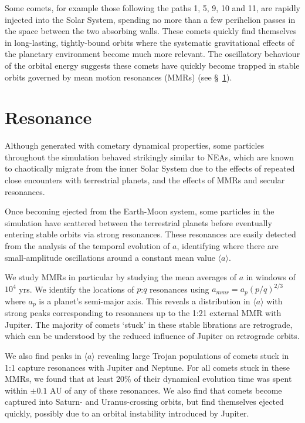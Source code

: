 Some comets, for example those following the paths 1, 5, 9, 10 and 11, are rapidly injected into the Solar System, spending no more than a few perihelion passes in the space between the two absorbing walls. These comets quickly find themselves in long-lasting, tightly-bound orbits where the systematic gravitational effects of the planetary environment become much more relevant. The oscillatory behaviour of the orbital energy suggests these comets have quickly become trapped in stable orbits governed by mean motion resonances (MMRs) (see \S~\ref{sec:resonance}).


\section{Resonance}
\label{sec:resonance}

Although generated with cometary dynamical properties, some particles throughout the simulation behaved strikingly similar to NEAs, which are known to chaotically migrate from the inner Solar System due to the effects of repeated close encounters with terrestrial planets, and the effects of MMRs and secular resonances.

Once becoming ejected from the Earth-Moon system, some particles in the simulation have scattered between the terrestrial planets before eventually entering stable orbits via strong resonances. These resonances are easily detected from the analysis of the temporal evolution of $a$, identifying where there are small-amplitude oscillations around a constant mean value $\langle a \rangle$. 

We study MMRs in particular by studying the mean averages of $a$ in windows of $10^4$ yrs. We identify the locations of $p$:$q$ resonances using $a_{mmr} = a_p (p/q)^{2/3}$ where $a_p$ is a planet's semi-major axis. This reveals a distribution in $\langle a \rangle$ with strong peaks corresponding to resonances up to the 1:21 external MMR with Jupiter. The majority of comets `stuck' in these stable librations are retrograde, which can be understood by the reduced influence of Jupiter on retrograde orbits. 

We also find peaks in $\langle a \rangle$ revealing large Trojan populations of comets stuck in 1:1 capture resonances with Jupiter and Neptune. For all comets stuck in these MMRs, we found that at least 20\% of their dynamical evolution time was spent within $\pm0.1$ AU of any of these resonances. We also find that comets become captured into Saturn- and Uranus-crossing orbits, but find themselves ejected quickly, possibly due to an orbital instability introduced by Jupiter.

